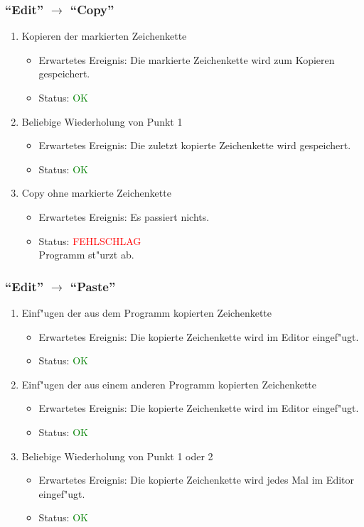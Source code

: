 \subsubsection{"`Edit"' $\rightarrow$ "`Copy"'}
\begin{enumerate}
\item Kopieren der markierten Zeichenkette
\begin{itemize}
\item Erwartetes Ereignis: Die markierte Zeichenkette wird zum Kopieren gespeichert. 
\item Status: \textcolor{green}{OK}
\end{itemize}
\item Beliebige Wiederholung von Punkt 1
\begin{itemize}
\item Erwartetes Ereignis: Die zuletzt kopierte Zeichenkette wird gespeichert. 
\item Status: \textcolor{green}{OK}
\end{itemize}
\item Copy ohne markierte Zeichenkette
\begin{itemize}
\item Erwartetes Ereignis: Es passiert nichts. 
\item Status: \textcolor{red}{FEHLSCHLAG} \\
Programm st"urzt ab.
\end{itemize}
\end{enumerate}
\subsubsection{"`Edit"' $\rightarrow$ "`Paste"'}
\begin{enumerate}
\item Einf"ugen der aus dem Programm kopierten Zeichenkette
\begin{itemize}
\item Erwartetes Ereignis: Die kopierte Zeichenkette wird im Editor eingef"ugt. 
\item Status: \textcolor{green}{OK}
\end{itemize}
\item Einf"ugen der aus einem anderen Programm kopierten Zeichenkette
\begin{itemize}
\item Erwartetes Ereignis: Die kopierte Zeichenkette wird im Editor eingef"ugt. 
\item Status: \textcolor{green}{OK}
\end{itemize}
\item Beliebige Wiederholung von Punkt 1 oder 2
\begin{itemize}
\item Erwartetes Ereignis: Die kopierte Zeichenkette wird jedes Mal im Editor eingef"ugt. 
\item Status: \textcolor{green}{OK}
\end{itemize}
\end{enumerate}
